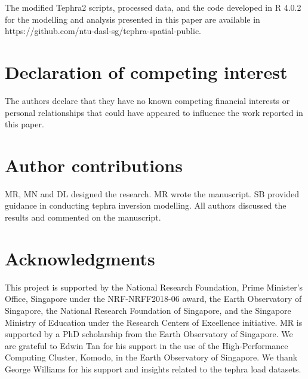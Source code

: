 \documentclass[a4paper,fleqn]{cas-sc}
\begin{document}
The modified Tephra2 scripts, processed data, and the code developed in R 4.0.2 \citep{team2013r} for the modelling and analysis presented in this paper are available in https://github.com/ntu-dasl-sg/tephra-spatial-public.




\section*{Declaration of competing interest}
The authors declare that they have no known competing financial interests or personal relationships that could have appeared to influence the work reported in this paper.

\section*{Author contributions}
MR, MN and DL designed the research. MR wrote the manuscript. SB provided guidance in conducting tephra inversion modelling. All authors discussed the results and commented on the manuscript.

\section*{Acknowledgments}
This project is supported by the National Research Foundation, Prime Minister’s Office, Singapore under the NRF-NRFF2018-06 award, the Earth Observatory of Singapore, the National Research Foundation of Singapore, and the Singapore Ministry of Education under the Research Centers of Excellence initiative. MR is supported by a PhD scholarship from the Earth Observatory of Singapore. We are grateful to Edwin Tan for his support in the use of the High-Performance Computing Cluster, Komodo, in the Earth Observatory of Singapore. We thank George Williams for his support and insights related to the tephra load datasets.
\end{document}
